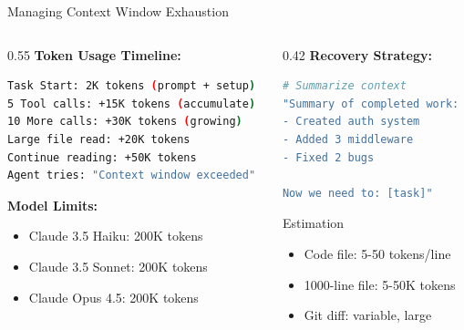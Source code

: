 \documentclass[aspectratio=169,11pt]{beamer}
\begin{document}
\begin{frame}[fragile]{Managing Context Window Exhaustion}
    \begin{columns}[T]
        \begin{column}{0.55\textwidth}
            \textbf{Token Usage Timeline:}
            \begin{lstlisting}[language=Bash]
Task Start: 2K tokens (prompt + setup)
5 Tool calls: +15K tokens (accumulate)
10 More calls: +30K tokens (growing)
Large file read: +20K tokens
Continue reading: +50K tokens
Agent tries: "Context window exceeded"
            \end{lstlisting}

            \vspace{0.2cm}
            \textbf{Model Limits:}
            \begin{itemize}
                \item Claude 3.5 Haiku: 200K tokens
                \item Claude 3.5 Sonnet: 200K tokens
                \item Claude Opus 4.5: 200K tokens
            \end{itemize}
        \end{column}
        \begin{column}{0.42\textwidth}
            \textbf{Recovery Strategy:}
            \begin{lstlisting}[language=Bash]
# Summarize context
"Summary of completed work:
- Created auth system
- Added 3 middleware
- Fixed 2 bugs

Now we need to: [task]"
            \end{lstlisting}

            \begin{block}{Estimation}
                \begin{itemize}
                    \item Code file: 5-50 tokens/line
                    \item 1000-line file: 5-50K tokens
                    \item Git diff: variable, large
                \end{itemize}
            \end{block}
        \end{column}
    \end{columns}
\end{frame}
\end{document}
